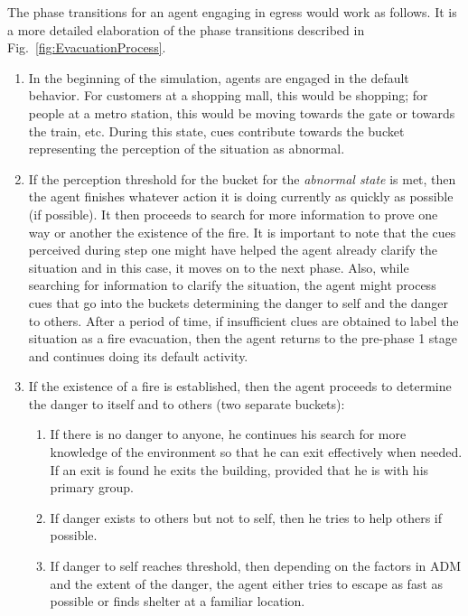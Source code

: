 The phase transitions for an agent engaging in egress would work as follows. It is a more detailed elaboration of the phase transitions described in Fig.~\ref{fig:EvacuationProcess}.

\begin{enumerate}
	\item In the beginning of the simulation, agents are engaged in the default behavior. For customers at a shopping mall, this would be shopping; for people at a metro station, this would be moving towards the gate or towards the train, etc. During this state, cues contribute towards the bucket representing the perception of the situation as abnormal.
	\item If the perception threshold for the bucket for the \emph{abnormal state} is met, then the agent finishes whatever action it is doing currently as quickly as possible (if possible). It then proceeds to search for more information to prove one way or another the existence of the fire. It is important to note that the cues perceived during step one might have helped the agent already clarify the situation and in this case, it moves on to the next phase. Also, while searching for information to clarify the situation, the agent might process cues that go into the buckets determining the danger to self and the danger to others. After a period of time, if insufficient clues are obtained to label the situation as a fire evacuation, then the agent returns to the pre-phase 1 stage and continues doing its default activity.
	\item If the existence of a fire is established, then the agent proceeds to determine the danger to itself and to others (two separate buckets):
	\begin{enumerate}
		\item If there is no danger to anyone, he continues his search for more knowledge of the environment so that he can exit effectively when needed. If an exit is found he exits the building, provided that he is with his primary group.
		\item If danger exists to others but not to self, then he tries to help others if possible.
		\item If danger to self reaches threshold, then depending on the factors in ADM and the extent of the danger, the agent either tries to escape as fast as possible or finds shelter at a familiar location.
	\end{enumerate}
\end{enumerate}

